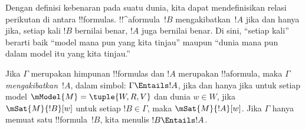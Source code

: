 \documentclass[../../../include/open-logic-section]{subfiles}
\begin{document}


\begin{explain}
  Dengan definisi kebenaran pada suatu dunia, kita dapat mendefinisikan relasi
  perikutan di antara !!{formula}s. !!^a{formula}~$!B$ mengakibatkan~$!A$
  jika dan hanya jika, setiap kali $!B$ bernilai benar, $!A$ juga bernilai
  benar. Di sini, ``setiap kali'' berarti baik ``model mana pun yang kita
  tinjau'' maupun ``dunia mana pun dalam model itu yang kita tinjau.''
\end{explain}

\begin{defn}
  Jika $\Gamma$ merupakan himpunan !!{formula}s dan $!A$ merupakan
  !!a{formula}, maka
  $\Gamma$ \emph{mengakibatkan}~$!A$, dalam simbol:
  $\Gamma \Entails !A$, jika dan hanya jika untuk setiap model
  $\mModel{M} = \tuple{W, R, V}$ dan dunia $w \in W$, jika
  $\mSat{M}{!B}[w]$ untuk setiap $!B \in \Gamma$, maka
  $\mSat{M}{!A}[w]$. Jika $\Gamma$ hanya memuat satu !!{formula}~$!B$,
  kita menulis $!B \Entails !A$.
\end{defn}
\end{document}
